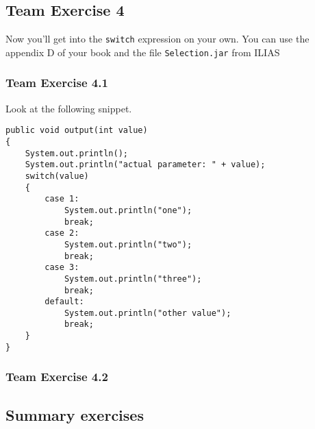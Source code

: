 \subsection{Team Exercise 4}
Now you'll get into the \lstinline{switch} expression on your own.
You can use the appendix D of your book and the file 
\verb!Selection.jar! from ILIAS

\subsubsection{Team Exercise 4.1}
Look at the following snippet.
\begin{lstlisting}
public void output(int value)
{
	System.out.println();
	System.out.println("actual parameter: " + value);
	switch(value)
	{
		case 1:
			System.out.println("one");
			break;
		case 2:
			System.out.println("two");
			break;
		case 3: 
			System.out.println("three");
			break;
		default:
			System.out.println("other value");
			break;
	}
}
\end{lstlisting}

\subsubsection{Team Exercise 4.2}



\subsection{Summary exercises}

